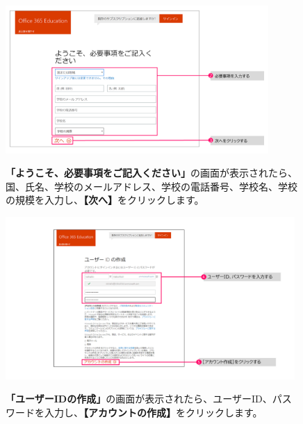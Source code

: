 \begin{figure}[h]
    \begin{minipage}{0.6\textwidth}
        \includegraphics[width=10cm]{figures/O365A1_submission02.png}
    \end{minipage}
    \begin{minipage}{0.4\textwidth}
       \textbf{「ようこそ、必要事項をご記入ください」}の画面が表示されたら、国、氏名、学校のメールアドレス、学校の電話番号、学校名、学校の規模を入力し、\textbf{【次へ】}をクリックします。
    \end{minipage}
\end{figure}

\begin{figure}[h]
    \begin{minipage}{0.6\textwidth}
        \hspace{-1.2cm}
        \includegraphics[width=11cm]{figures/O365A1_submission03.png}
    \end{minipage}
    \begin{minipage}{0.4\textwidth}
       \textbf{「ユーザーIDの作成」}の画面が表示されたら、ユーザーID、パスワードを入力し、\textbf{【アカウントの作成】}をクリックします。
    \end{minipage}
\end{figure}

